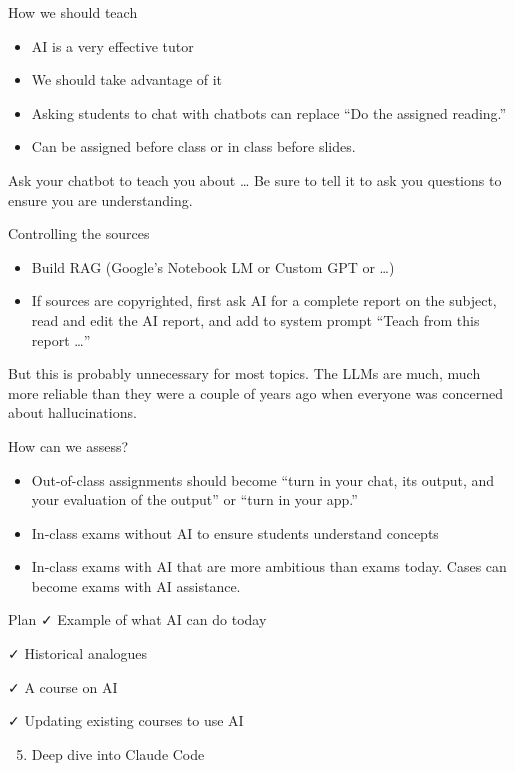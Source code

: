 \documentclass[
  ignorenonframetext,
]{beamer}
\providecommand{\tightlist}{%
  \setlength{\itemsep}{0pt}\setlength{\parskip}{0pt}}
\begin{document}
\begin{frame}{How we should teach}
\label{how-we-should-teach}
\begin{itemize}
\tightlist
\item
  AI is a very effective tutor
\item
  We should take advantage of it
\item
  {Asking students to chat with chatbots can replace ``Do the assigned
  reading.''}
\item
  Can be assigned before class or in class before slides.
\end{itemize}

Ask your chatbot to teach you about \ldots{} Be sure to tell it to ask
you questions to ensure you are understanding.
\end{frame}

\begin{frame}{Controlling the sources}
\label{controlling-the-sources}
\begin{itemize}
\tightlist
\item
  Build RAG (Google's Notebook LM or Custom GPT or \ldots)
\item
  If sources are copyrighted, first ask AI for a complete report on the
  subject, read and edit the AI report, and add to system prompt ``Teach
  from this report \ldots{}''
\end{itemize}

But this is probably unnecessary for most topics. The LLMs are much,
much more reliable than they were a couple of years ago when everyone
was concerned about hallucinations.
\end{frame}

\begin{frame}{How can we assess?}
\label{how-can-we-assess}
\begin{itemize}[<+->]
\tightlist
\item
  Out-of-class assignments should become ``turn in your chat, its
  output, and your evaluation of the output'' or ``turn in your app.''
\item
  In-class {exams without AI} to ensure students understand concepts
\item
  In-class {exams with AI} that are more ambitious than exams today.
  Cases can become exams with AI assistance.
\end{itemize}
\end{frame}

\begin{frame}{Plan}
\label{plan-3}
✓ Example of what AI can do today

✓ Historical analogues

✓ A course on AI

✓ Updating existing courses to use AI

\begin{enumerate}
\setcounter{enumi}{4}
\tightlist
\item
  Deep dive into Claude Code
\end{enumerate}
\end{frame}
\end{document}
